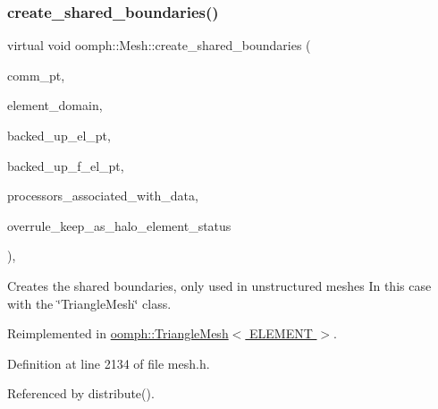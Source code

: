 \subsubsection{\texorpdfstring{create\+\_\+shared\+\_\+boundaries()}{create\_shared\_boundaries()}}
{\footnotesize\ttfamily virtual void oomph\+::\+Mesh\+::create\+\_\+shared\+\_\+boundaries (\begin{DoxyParamCaption}\item[{\hyperlink{classoomph_1_1OomphCommunicator}{Oomph\+Communicator} $\ast$}]{comm\+\_\+pt,  }\item[{const \hyperlink{classoomph_1_1Vector}{Vector}$<$ unsigned $>$ \&}]{element\+\_\+domain,  }\item[{const \hyperlink{classoomph_1_1Vector}{Vector}$<$ \hyperlink{classoomph_1_1GeneralisedElement}{Generalised\+Element} $\ast$$>$ \&}]{backed\+\_\+up\+\_\+el\+\_\+pt,  }\item[{const \hyperlink{classoomph_1_1Vector}{Vector}$<$ \hyperlink{classoomph_1_1FiniteElement}{Finite\+Element} $\ast$$>$ \&}]{backed\+\_\+up\+\_\+f\+\_\+el\+\_\+pt,  }\item[{std\+::map$<$ \hyperlink{classoomph_1_1Data}{Data} $\ast$, std\+::set$<$ unsigned $>$ $>$ \&}]{processors\+\_\+associated\+\_\+with\+\_\+data,  }\item[{const bool \&}]{overrule\+\_\+keep\+\_\+as\+\_\+halo\+\_\+element\+\_\+status }\end{DoxyParamCaption})\hspace{0.3cm}{\ttfamily [inline]}, {\ttfamily [virtual]}}



Creates the shared boundaries, only used in unstructured meshes In this case with the \char`\"{}\+Triangle\+Mesh\char`\"{} class. 



Reimplemented in \hyperlink{classoomph_1_1TriangleMesh_a2e26905533350a8cc0e47ed3260054e2}{oomph\+::\+Triangle\+Mesh$<$ E\+L\+E\+M\+E\+N\+T $>$}.



Definition at line 2134 of file mesh.\+h.



Referenced by distribute().

\mbox{\label{classoomph_1_1Mesh_a9e3ecb07dc622cf37ce0085446ff9aa6}} 
